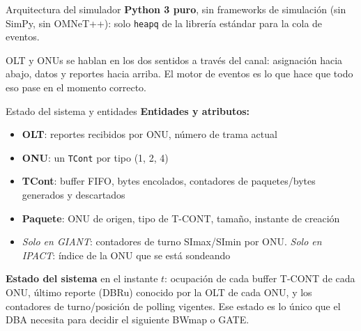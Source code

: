 \documentclass[aspectratio=169,t]{beamer}
\begin{document}
\begin{frame}{Arquitectura del simulador}
    \footnotesize
    \textbf{Python 3 puro}, sin frameworks de simulación (sin SimPy, sin
    OMNeT++): solo \texttt{heapq} de la librería estándar para la cola de
    eventos.

    \vspace{0.2cm}
    \begin{center}
    \end{center}
    \footnotesize
    OLT y ONUs se hablan en los dos sentidos a través del canal:
    asignación hacia abajo, datos y reportes hacia arriba. El motor de
    eventos es lo que hace que todo eso pase en el momento correcto.
\end{frame}

\begin{frame}{Estado del sistema y entidades}
    \footnotesize
    \textbf{Entidades y atributos:}
    \begin{itemize}
        \item \textbf{OLT}: reportes recibidos por ONU, número de trama actual
        \item \textbf{ONU}: un \texttt{TCont} por tipo (1, 2, 4)
        \item \textbf{TCont}: buffer FIFO, bytes encolados, contadores de
              paquetes/bytes generados y descartados
        \item \textbf{Paquete}: ONU de origen, tipo de T-CONT, tamaño,
              instante de creación
        \item \textit{Solo en GIANT}: contadores de turno SImax/SImin por ONU.
              \textit{Solo en IPACT}: índice de la ONU que se está sondeando
    \end{itemize}

    \vspace{0.2cm}
    \textbf{Estado del sistema} en el instante $t$: ocupación de cada
    buffer T-CONT de cada ONU, último reporte (DBRu) conocido por la OLT
    de cada ONU, y los contadores de turno/posición de polling vigentes.
    Ese estado es lo único que el DBA necesita para decidir el siguiente
    BWmap o GATE.
\end{frame}
\end{document}
